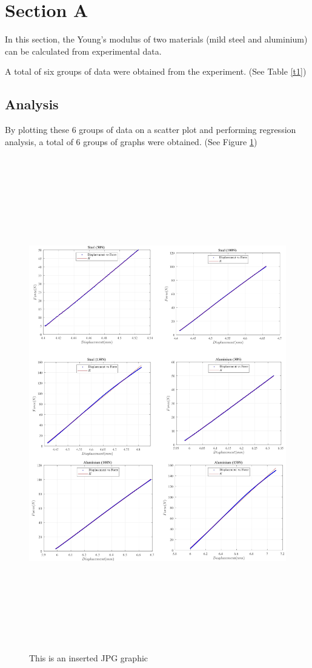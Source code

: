 \section*{Section A}
\label{sec:Section A}
\FloatBarrier %


In this section, the Young's modulus of two materials 
(mild steel and aluminium) can be calculated from experimental data.

A total of six groups of data were obtained from the experiment. (See Table \ref{t1})

\subsection*{Analysis}

By plotting these 6 groups of data on a scatter plot and performing 
regression analysis, a total of 6 groups of graphs were obtained. (See Figure \ref{f1})

\begin{figure}
    \centering
    \includegraphics[width=15cm,height=21.5cm]{./fig/mix.jpg}
    \caption{This is an inserted JPG graphic}
    \label{f1}
\end{figure}

